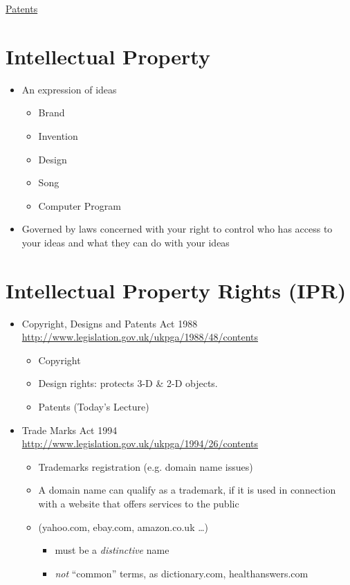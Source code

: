 \documentclass{article}
\begin{document}
\begin{center}
	\underline{\huge Patents}
\end{center}

\section{Intellectual Property}
\begin{itemize}
\item An expression of ideas
\begin{itemize}
\item Brand
\item Invention
\item Design
\item Song
\item Computer Program
\end{itemize}
\item Governed by laws concerned with your right to control who has access to your ideas and what they can do with your ideas
\end{itemize}



\section{Intellectual Property Rights (IPR)}
\begin{itemize}
\item Copyright, Designs and Patents Act 1988
 \url{http://www.legislation.gov.uk/ukpga/1988/48/contents}
\begin{itemize}
\item Copyright
\item Design rights: protects 3-D \& 2-D objects.
\item Patents (Today's Lecture)
\end{itemize}
\item Trade Marks Act 1994 
\url{http://www.legislation.gov.uk/ukpga/1994/26/contents}
\begin{itemize}
\item Trademarks registration (e.g. domain name issues)
\item A domain name can qualify as a trademark, if it is used in connection with a website that offers services to the public
\item (yahoo.com, ebay.com, amazon.co.uk \ldots)
\begin{itemize}
\item must be a \emph{distinctive} name
\item \emph{not} ``common'' terms, as dictionary.com, healthanswers.com
\end{itemize}
\end{itemize}
\end{itemize}
\end{document}
